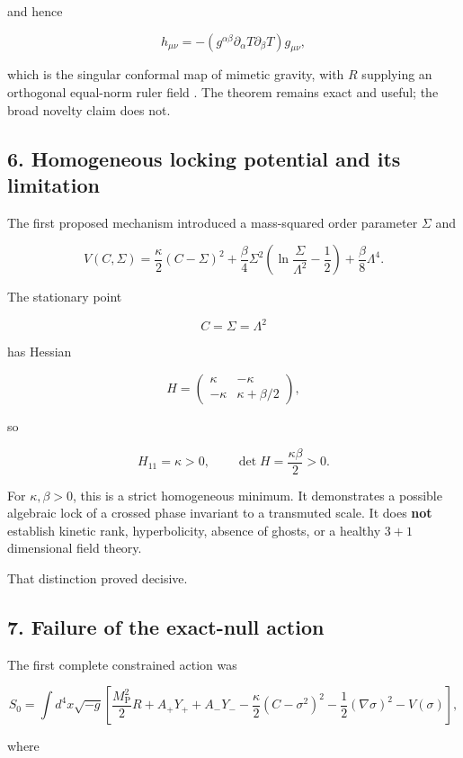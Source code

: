 \documentclass[
]{article}
\begin{document}
and hence

\[
h_{\mu\nu}=-(g^{\alpha\beta}\partial_\alpha T\partial_\beta T)g_{\mu\nu},
\]

which is the singular conformal map of mimetic gravity, with \(R\)
supplying an orthogonal equal-norm ruler field
. The theorem remains exact and
useful; the broad novelty claim does not.

\subsection{6. Homogeneous locking potential and its
limitation}\label{homogeneous-locking-potential-and-its-limitation}

The first proposed mechanism introduced a mass-squared order parameter
\(\Sigma\) and

\[
V(C,\Sigma)
=\frac\kappa2(C-\Sigma)^2
+\frac\beta4\Sigma^2\left(\ln\frac{\Sigma}{\Lambda^2}-\frac12\right)
+\frac\beta8\Lambda^4.
\]

The stationary point

\[
C=\Sigma=\Lambda^2
\]

has Hessian

\[
H=
\begin{pmatrix}
\kappa&-\kappa\\
-\kappa&\kappa+\beta/2
\end{pmatrix},
\]

so

\[
H_{11}=\kappa>0,
\qquad
\det H=\frac{\kappa\beta}{2}>0.
\]

For \(\kappa,\beta>0\), this is a strict homogeneous minimum. It
demonstrates a possible algebraic lock of a crossed phase invariant to a
transmuted scale. It does \textbf{not} establish kinetic rank,
hyperbolicity, absence of ghosts, or a healthy \(3+1\) dimensional field
theory.

That distinction proved decisive.

\subsection{7. Failure of the exact-null
action}\label{failure-of-the-exact-null-action}

The first complete constrained action was

\[
S_0=\int d^4x\sqrt{-g}\left[
\frac{M_{\mathrm{P}}^2}{2}R
+A_+Y_++A_-Y_-
-\frac\kappa2(C-\sigma^2)^2
-\frac12(\nabla\sigma)^2
-V(\sigma)
\right],
\]

where
\end{document}

